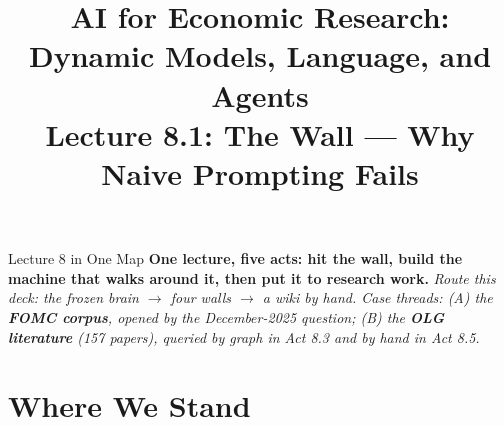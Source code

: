 


\usetikzlibrary{positioning, arrows.meta, shapes, calc, decorations.pathreplacing}

\graphicspath{{./pic/}{./figures/}{../../MiniCourse_8hr/Slides/Module4_Agentic_AI/pic/}{../}}



\title[AI for Econ Research]{AI for Economic Research: Dynamic Models, Language, and Agents\\
Lecture 8.1: The Wall --- Why Naive Prompting Fails}



\makebeamertitle

\begin{frame}{Lecture 8 in One Map}
\textbf{One lecture, five acts: hit the wall, build the machine that walks around it, then put it to research work.}
\textit{\footnotesize Route this deck: the frozen brain $\to$ four walls $\to$ a wiki by hand.
Case threads: (A) the \textbf{FOMC corpus}, opened by the December-2025 question;
(B) the \textbf{OLG literature} (157 papers), queried by graph in Act 8.3 and by hand in Act 8.5.}
\end{frame}

\section{Where We Stand}

